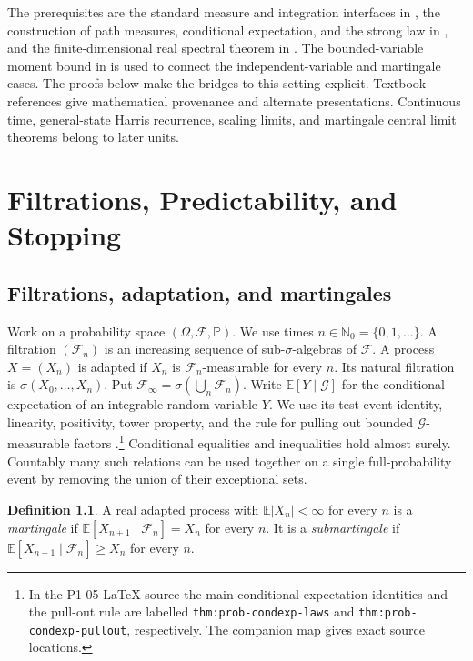 \documentclass[11pt,oneside,openany]{book}
\theoremstyle{plain}
\theoremstyle{definition}
\newtheorem{definition}[theorem]{Definition}
\theoremstyle{remark}
\begin{document}
The prerequisites are the standard measure and integration interfaces
in \cite{D11}, the construction of path measures, conditional
expectation, and the strong law in \cite{P105}, and the finite-dimensional
real spectral theorem in \cite{D05}. The bounded-variable moment bound
in \cite{P205} is used to connect the independent-variable and
martingale cases. The proofs below make the bridges to this setting
explicit. Textbook references give mathematical provenance and
alternate presentations. Continuous time, general-state Harris
recurrence, scaling limits, and martingale central limit theorems
belong to later units.

\mainmatter
\chapter{Filtrations, Predictability, and Stopping}

\section{Filtrations, adaptation, and martingales}\label{p207:W01}

Work on a probability space \((\Omega,\mathcal F,\mathbb P)\).
We use times \(n\in\mathbb N_0=\{0,1,\ldots\}\). A filtration
\((\mathcal F_n)\) is an increasing sequence of sub-\(\sigma\)-algebras
of \(\mathcal F\). A process \(X=(X_n)\) is adapted if \(X_n\) is
\(\mathcal F_n\)-measurable for every \(n\). Its natural filtration
is \(\sigma(X_0,\ldots,X_n)\). Put
\(\mathcal F_\infty=\sigma(\bigcup_n\mathcal F_n)\).
Write \(\mathbb E[Y\mid\mathcal G]\) for the conditional expectation
of an integrable random variable \(Y\). We use its test-event identity,
linearity, positivity, tower property, and the rule for pulling out
bounded \(\mathcal G\)-measurable factors
\cite[conditional-expectation laws and pull-out rule]{P105}.\footnote{In the
P1-05 LaTeX source the main conditional-expectation identities and
the pull-out rule are labelled \texttt{thm:prob-condexp-laws}
and \texttt{thm:prob-condexp-pullout}, respectively. The companion
map gives exact source locations.}
Conditional equalities and inequalities hold almost surely. Countably
many such relations can be used together on a single full-probability
event by removing the union of their exceptional sets.

\begin{definition}
A real adapted process with \(\mathbb E|X_n|<\infty\) for every \(n\) is a
\emph{martingale} if
\(\mathbb E[X_{n+1}\mid\mathcal F_n]=X_n\) for every \(n\).
It is a \emph{submartingale} if
\(\mathbb E[X_{n+1}\mid\mathcal F_n]\ge X_n\) for every \(n\).
\end{definition}
\end{document}
